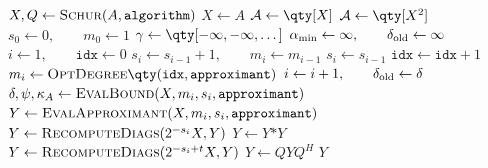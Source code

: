 \begin{algorithm}[hbp]
	\caption{\emph{Multiprecision scaling and squaring algorithm for the matrix exponential.}}
	\label{alg:exp_mp_pseudocode}
	\begin{algorithmic}[1]
			\State $X,Q\gets\textsc{Schur}(A,\mathtt{algorithm})$
		\Else 
			\State $X\gets A$
		\EndIf
			\State $\mathcal{A}\gets\qty[X]$
		\Else
			\State $\mathcal{A}\gets\qty[X^2]$\label{line:initialize_A:pade}
		\EndIf
		\State $s_0\gets 0,\qquad m_0\gets 1$
		\State $\gamma\gets\qty[-\infty,-\infty,\dots]$
		\State $\alpha_{\min}\gets\infty,\qquad\delta_{\textup{old}}\gets\infty$
		\State $i\gets 1,\qquad \mathtt{idx}\gets 0$
		\label{line:stop_crit}
			\label{line:increase_s_condition}
				\State $s_{i}\gets s_{i-1}+1,\qquad m_i\gets m_{i-1}$
			\Else 
				\State $s_i\gets s_{i-1}$
				\State $\mathtt{idx}\gets \mathtt{idx}+1$
				\State $m_i\gets\textsc{OptDegree}\qty(\mathtt{idx},\mathtt{approximant})$\label{line:increase_m}
			\EndIf
			\State $i\gets i+1, \qquad \delta_{\textup{old}}\gets\delta$
			\State $\delta, \psi, \kappa_A \gets \textsc{EvalBound}(X, m_i, s_i, \mathtt{approximant})$\label{line:reevaluate_bound}
		\EndWhile\label{line:endWhile}
		\State $Y\gets\textsc{EvalApproximant}(X,m_i,s_i,\mathtt{approximant})$\label{line:eval_approximant}
			\State $Y\gets\textsc{RecomputeDiags}(2^{-s_i}X,Y)$
		\EndIf
			\State $Y\gets Y\mathtt{*}Y$
				\State $Y\gets \textsc{RecomputeDiags}(2^{-s_i+t}X,Y)$
			\EndIf
		\EndFor
			\State $Y\gets QYQ^{H}$	
		\EndIf
		\State\Return $Y$
		\EndFunction
	\end{algorithmic}
\end{algorithm}

